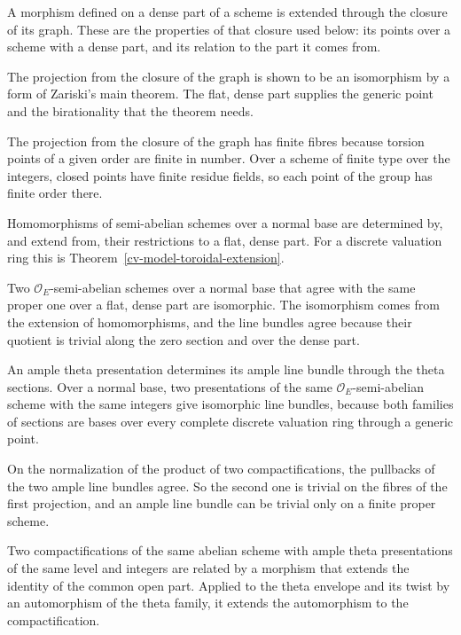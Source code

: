A morphism defined on a dense part of a scheme is extended through the closure of its graph. These are the
properties of that closure used below: its points over a scheme with a dense part, and its relation to the part
it comes from.

The projection from the closure of the graph is shown to be an isomorphism by a form of Zariski's main theorem.
The flat, dense part supplies the generic point and the birationality that the theorem needs.

The projection from the closure of the graph has finite fibres because torsion points of a given order are finite
in number. Over a scheme of finite type over the integers, closed points have finite residue fields, so each point
of the group has finite order there.

Homomorphisms of semi-abelian schemes over a normal base are determined by, and extend from, their
restrictions to a flat, dense part. For a discrete valuation ring this is
Theorem~\ref{cv-model-toroidal-extension}.

Two $\mathcal O_E$-semi-abelian schemes over a normal base that agree with the same proper one over a
flat, dense part are isomorphic. The isomorphism comes from the extension of homomorphisms, and the
line bundles agree because their quotient is trivial along the zero section and over the dense part.

An ample theta presentation determines its ample line bundle through the theta sections. Over a normal
base, two presentations of the same $\mathcal O_E$-semi-abelian scheme with the same integers give
isomorphic line bundles, because both families of sections are bases over every complete discrete
valuation ring through a generic point.

On the normalization of the product of two compactifications, the pullbacks of the two ample line
bundles agree. So the second one is trivial on the fibres of the first projection, and an ample line
bundle can be trivial only on a finite proper scheme.

Two compactifications of the same abelian scheme with ample theta presentations of the same level and
integers are related by a morphism that extends the identity of the common open part. Applied to the
theta envelope and its twist by an automorphism of the theta family, it extends the automorphism to
the compactification.

